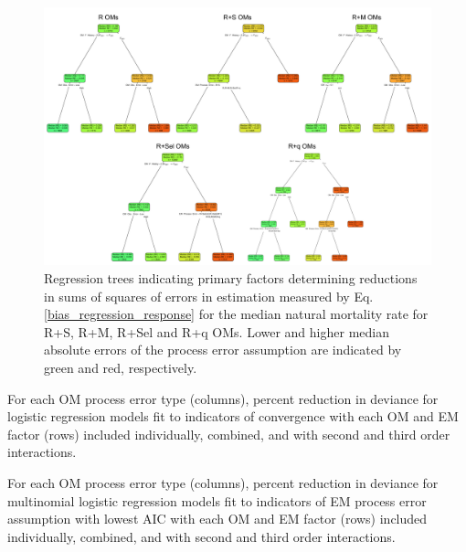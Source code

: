 \documentclass[
  12pt,
]{article}
\begin{document}
\begin{landscape}
\begin{figure}
\begin{center}
\includegraphics{med_M_bias_regtree_plots}
\end{center}
\caption{Regression trees indicating primary factors determining reductions in sums of squares of errors in estimation measured by Eq. \ref{bias_regression_response} for the median natural mortality rate for R+S, R+M, R+Sel and R+q OMs. Lower and higher median absolute errors of the process error assumption are indicated by green and red, respectively.}\label{med_MA_bias_regtree}
\end{figure}
\end{landscape}

\pagebreak

\begin{table}
\caption{For each OM process error type (columns), percent reduction in deviance for logistic regression models fit to indicators of convergence with each OM and EM factor (rows) included individually, combined, and with second and third order interactions.}\label{convergence_PRD_table}
{}
\end{table}

\begin{table}
\caption{For each OM process error type (columns), percent reduction in deviance for multinomial logistic regression models fit to indicators of EM process error assumption with lowest AIC with each OM and EM factor (rows) included individually, combined, and with second and third order interactions.}\label{AIC_PE_PRD_table}
{}
\end{table}
\end{document}
